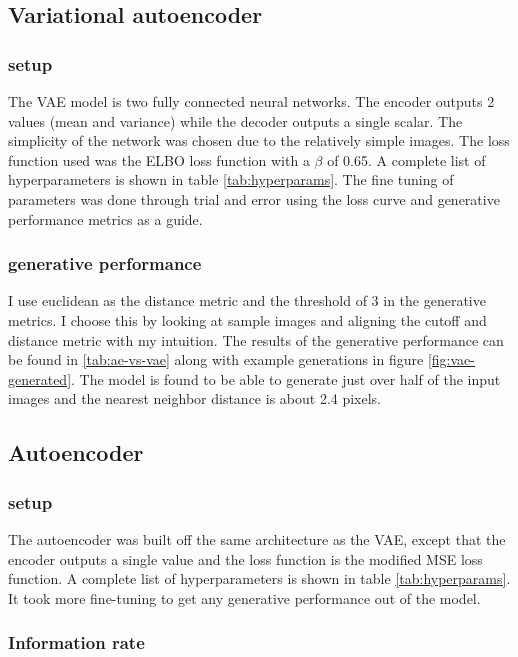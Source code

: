 \documentclass[conference,a4paper]{IEEEtran}
\begin{document}
\subsection{Variational autoencoder}
    
\subsubsection{setup}

The VAE model is two fully connected neural networks. The encoder outputs 2 values (mean and variance) while the decoder outputs a single scalar. The simplicity of the network was chosen due to the relatively simple images. The loss function used was the ELBO loss function with a $\beta$ of 0.65. A complete list of hyperparameters is shown in table \ref{tab:hyperparams}. The fine tuning of parameters was done through trial and error using the loss curve and generative performance metrics as a guide.

\subsubsection{generative performance}

I use euclidean as the distance metric and the threshold of 3 in the generative metrics. I choose this by looking at sample images and aligning the cutoff and distance metric with my intuition. The results of the generative performance can be found in \ref{tab:ae-vs-vae} along with example generations in figure \ref{fig:vae-generated}. The model is found to be able to generate just over half of the input images and the nearest neighbor distance is about 2.4 pixels.

\subsection{Autoencoder}

\subsubsection{setup}
The autoencoder was built off the same architecture as the VAE, except that the encoder outputs a single value and the loss function is the modified MSE loss function. A complete list of hyperparameters is shown in table \ref{tab:hyperparams}. It took more fine-tuning to get any generative performance out of the model.

\subsubsection{Information rate}
\end{document}
